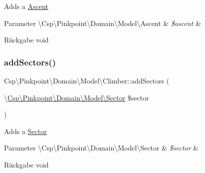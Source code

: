Adds a \hyperlink{classCsp_1_1Pinkpoint_1_1Domain_1_1Model_1_1Ascent}{Ascent}


\begin{DoxyParams}[1]{Parameter}
\textbackslash{}\+Csp\textbackslash{}\+Pinkpoint\textbackslash{}\+Domain\textbackslash{}\+Model\textbackslash{}\+Ascent & {\em \$ascent} & \\
\hline
\end{DoxyParams}
\begin{DoxyReturn}{Rückgabe}
void 
\end{DoxyReturn}
\mbox{\label{classCsp_1_1Pinkpoint_1_1Domain_1_1Model_1_1Climber_a540984529f615244e0c302fa6cc20dda}} 
\subsubsection{\texorpdfstring{add\+Sectors()}{addSectors()}}
{\footnotesize\ttfamily Csp\textbackslash{}\+Pinkpoint\textbackslash{}\+Domain\textbackslash{}\+Model\textbackslash{}\+Climber\+::add\+Sectors (\begin{DoxyParamCaption}\item[{\textbackslash{}\hyperlink{classCsp_1_1Pinkpoint_1_1Domain_1_1Model_1_1Sector}{Csp\textbackslash{}\+Pinkpoint\textbackslash{}\+Domain\textbackslash{}\+Model\textbackslash{}\+Sector}}]{\$sector }\end{DoxyParamCaption})}

Adds a \hyperlink{classCsp_1_1Pinkpoint_1_1Domain_1_1Model_1_1Sector}{Sector}


\begin{DoxyParams}[1]{Parameter}
\textbackslash{}\+Csp\textbackslash{}\+Pinkpoint\textbackslash{}\+Domain\textbackslash{}\+Model\textbackslash{}\+Sector & {\em \$sector} & \\
\hline
\end{DoxyParams}
\begin{DoxyReturn}{Rückgabe}
void 
\end{DoxyReturn}
\mbox{\label{classCsp_1_1Pinkpoint_1_1Domain_1_1Model_1_1Climber_ab2db9b7db3ebcbd4287378e5a78bbfd4}} 
